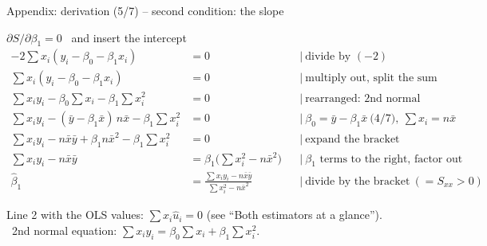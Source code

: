 \documentclass[aspectratio=169,11pt]{beamer}
\newcommand{\tsum}{\textstyle\sum}
\begin{document}
\begin{frame}{Appendix: derivation (5/7) -- second condition: the slope}
  \begin{block}{$\partial S / \partial \beta_1 = 0$ \ and insert the intercept}
    \vspace{-8pt}
    \small
    \begin{align*}
      -2\tsum x_i (y_i - \beta_0 - \beta_1 x_i) &= 0
        && \mid\ \text{divide by } (-2) \\
      \tsum x_i (y_i - \beta_0 - \beta_1 x_i) &= 0
        && \mid\ \text{multiply out, split the sum} \\
      \tsum x_i y_i - \beta_0 \tsum x_i - \beta_1 \tsum x_i^{2} &= 0
        && \mid\ \text{rearranged: 2nd normal equation} \\
      \tsum x_i y_i - (\bar{y} - \beta_1 \bar{x})\, n\bar{x} - \beta_1 \tsum x_i^{2} &= 0
        && \mid\ \beta_0 = \bar{y} - \beta_1 \bar{x} \ \text{(4/7)}, \ \tsum x_i = n\bar{x} \\
      \tsum x_i y_i - n\bar{x}\bar{y} + \beta_1 n\bar{x}^{2} - \beta_1 \tsum x_i^{2} &= 0
        && \mid\ \text{expand the bracket} \\
      \tsum x_i y_i - n\bar{x}\bar{y} &= \beta_1 \bigl(\tsum x_i^{2} - n\bar{x}^{2}\bigr)
        && \mid\ \beta_1\text{ terms to the right, factor out} \\
      \hat{\beta}_1 &= \frac{\tsum x_i y_i - n\bar{x}\bar{y}}{\tsum x_i^{2} - n\bar{x}^{2}}
        && \mid\ \text{divide by the bracket} \ (= S_{xx} > 0)
    \end{align*}
    \vspace{-14pt}
  \end{block}

  \footnotesize Line 2 with the OLS values: $\sum x_i \hat{u}_i = 0$ (see
  ``Both estimators at a glance''). \ 2nd normal equation:
  $\sum x_i y_i = \beta_0 \sum x_i + \beta_1 \sum x_i^{2}$.
\end{frame}
\end{document}
